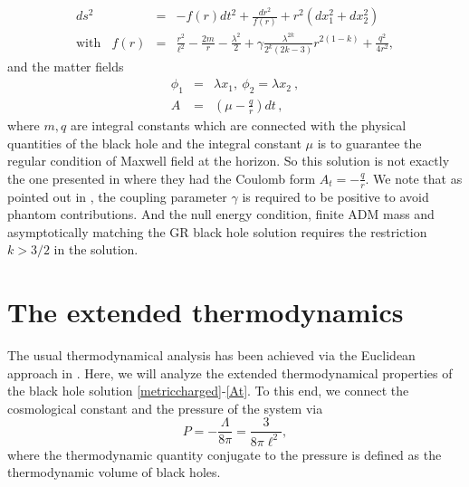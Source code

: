 \documentclass[preprint,showpacs,showkeys,onecolumn,nofootinbib]{revtex4}
\begin{document}
\begin{eqnarray}
ds^2&=&-f(r)dt^2+\frac{dr^2}{f(r)}+r^2(dx_1^2+dx_2^2)\,\label{metriccharged}\\ \mathrm{with}~~~~
f(r)&=&\frac{r^2}{\ell^2}-\frac{2m}{r}-\frac{\lambda^2}{2}+\gamma\frac{\lambda^{2k}}{2^k(2k-3)}r^{2(1-k)}+\frac{q^2}{4
r^2}, \label{metricf}
\end{eqnarray}
and the matter fields
\begin{eqnarray}
\phi_1&=&\lambda x_1,\ \phi_2=\lambda x_2\ , \label{axions}\\
A&=&\left(\mu-\frac{q}{r}\right)dt\,,\label{At}
\end{eqnarray}
where $m,q$ are integral constants which are connected with the physical quantities of the black hole and the integral constant  $\mu$ is to guarantee the regular condition of Maxwell field at the horizon. So this solution is not exactly the one presented in  \cite{Cisterna:2017jmv} where they had the Coulomb form $A_t=-\frac{q}{r}$.
We note that as pointed out in \cite{Cisterna:2017jmv},  the coupling parameter $\gamma$ is required  to be positive to avoid phantom
contributions. And the null energy condition, finite ADM mass and asymptotically matching the GR black hole solution requires the restriction $k>3/2$ in the solution.


\section{The extended thermodynamics }\label{sec:E-thermo}
 The usual thermodynamical analysis has been achieved via the Euclidean approach in \cite{Cisterna:2017jmv}. Here, we will analyze the extended thermodynamical properties of the black hole solution \eqref{metriccharged}-\eqref{At}. To this end,  we connect the cosmological constant and the pressure of the system via \cite{Kastor:2009wy,Dolan:2010ha,Cvetic:2010jb,Dolan:2011xt}
\begin{equation}\label{defP}
P=-\frac{\Lambda}{8\pi}=\frac{3}{8\pi\ell^2},
\end{equation}
where the thermodynamic quantity conjugate to the pressure is defined as the thermodynamic volume of black holes.
\end{document}
